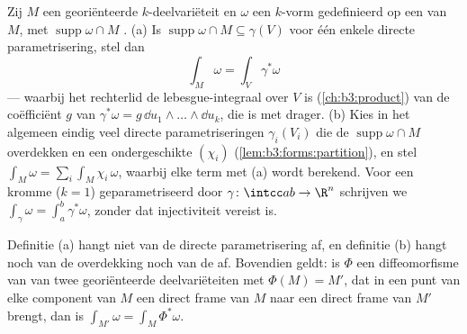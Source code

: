 \begin{definition}\label{def:b3:forms:integral}
Zij $M$ een georiënteerde $k$-deelvariëteit en $\omega$ een
$k$-vorm gedefinieerd op een  van $M$, met
$\operatorname{supp}\omega \cap M$ .
(a) Is $\operatorname{supp}\omega \cap M \subseteq \gamma(V)$
voor één enkele directe parametrisering, stel dan
\[
\int_M\omega = \int_V\gamma^*\omega
\]
--- waarbij het rechterlid de lebesgue-integraal over $V$ is
(\cref{ch:b3:product}) van de coëfficiënt $g$ van
$\gamma^*\omega = g\,\dd u_1\wedge\dots\wedge\dd u_k$, die
 is met  drager.
(b) Kies in het algemeen eindig veel directe parametriseringen
$\gamma_i(V_i)$ die de  $\operatorname{supp}\omega \cap
M$ overdekken en een ondergeschikte 
$(\chi_i)$ (\cref{lem:b3:forms:partition}), en stel
$\int_M\omega = \sum_i\int_M\chi_i\,\omega$, waarbij elke term
met (a) wordt berekend.
Voor een kromme ($k = 1$) geparametriseerd door
$\gamma\colon\intcc ab\to\R^n$ schrijven we $\int_\gamma\omega =
\int_a^b\gamma^*\omega$, zonder dat injectiviteit vereist is.
\end{definition}

\begin{lemma}[Consistentie]\label{lem:b3:forms:consistency}
Definitie (a) hangt niet van de directe parametrisering af, en
definitie (b) hangt noch van de overdekking noch van de  af. Bovendien geldt: is $\Phi$ een diffeomorfisme
van  van twee georiënteerde deelvariëteiten met
$\Phi(M) = M'$, dat in een punt van elke component van $M$ een
direct frame van $M$ naar een direct frame van $M'$ brengt, dan
is $\int_{M'}\omega = \int_M\Phi^*\omega$.
\end{lemma}

